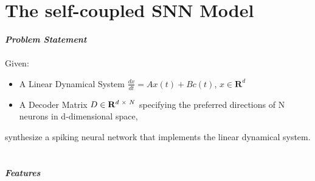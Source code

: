 \section{The self-coupled SNN Model}

\textit{\textbf{Problem Statement}}
\\
\\
 Given:

\begin{itemize}
    \item A Linear Dynamical System  $\frac{dx}{dt} = A x(t) + B c(t)$,  $x \in \mathbf{R}^d$
    
    \item A Decoder Matrix $D \in \mathbf{R}^{d\hspace{1mm} \times \hspace{1mm}N}$ specifying the preferred directions of N neurons in d-dimensional space,
    
\end{itemize}
synthesize a spiking neural network that implements the linear dynamical system.   
\\
\\
\\
\textbf{\textit{Features}}
\\
